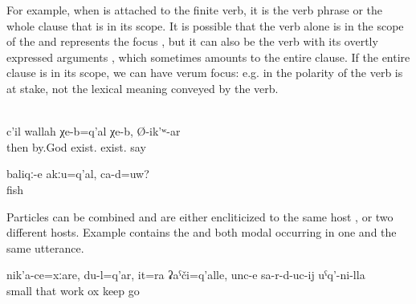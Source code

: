 For example, when  is attached to the finite verb, it is the verb phrase or the whole clause that is in its scope. It is possible that the verb alone is in the scope of the  and represents the focus , but it can also be the verb with its overtly expressed arguments , which sometimes amounts to the entire clause. If the entire clause is in its scope, we can have verum focus: e.g. in  the polarity of the verb is at stake, not the lexical meaning conveyed by the verb.
%
\begin{exe}
	\\\label{ex:Well, by God, we do have them, he said@17c}%
	\gll	c'il	wallah	χe-b=q'al	χe-b,	Ø-ik'ʷ-ar\\
		then	by.God	exist.	exist.	say\\
	\glt	{}

	\ex	\label{ex:These are NOT fish, right@8e}
	\gll	baliqː-e	akːu=q'al,	ca-d=uw?\\
		fish		\\
	\glt	{}
\end{exe}

Particles can be combined and are either encliticized to the same host ,  or two different hosts. Example  contains the  and both modal  occurring in one and the same utterance.
%
\begin{exe}
	\ex	\label{ex:‎Although I was little, I myself went behind the oxen, this is also work}
	\gll	nik'a-ce=xːare,	du-l=q'ar, it=ra	ʡaˁči=q'alle,	unc-e	sa-r-d-uc-ij	uˁq'-ni-lla\\
		small		that	work	ox	keep		go\\
	\glt	{}
\end{exe}

